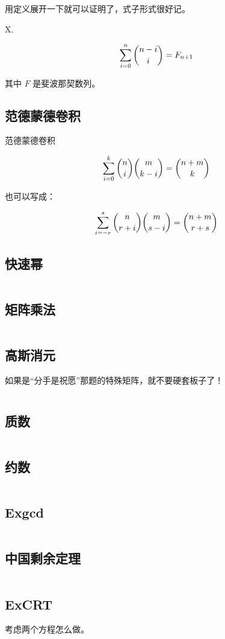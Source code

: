 \documentclass[titlepage, a4paper]{article}
\begin{document}
\begin{multicols}{2}
\begin{spacing}{0.6}
				 	用定义展开一下就可以证明了，式子形式很好记。
				 	
				 	X.
				 	
				 	$$
				 	\sum_{i=0}^n\dbinom{n-i}{i}=F_{n+1}
				 	$$
				 	
				 	其中 $F$ 是斐波那契数列。
			 	\subsection{范德蒙德卷积}
				 	范德蒙德卷积
				 	
				 	$$
				 	\sum\limits_{i = 0}^k \dbinom{n}{i}\dbinom{m}{k - i} = \dbinom{n + m}{k}
				 	$$
				 	
				 	也可以写成：
				 	
				 	$$
				 	\sum\limits_{i = -r}^s \dbinom{n}{r + i} \dbinom{m}{s - i} = \dbinom{n + m}{r + s}
				 	$$
			 	\subsection{快速幂}
			 		\inputminted{cpp}{src/Math/Qpow.cpp}
			 	\subsection{矩阵乘法}
			 		\inputminted{cpp}{src/Math/Matrix_mul.cpp}
			 	\subsection{高斯消元}
			 		如果是“分手是祝愿”那题的特殊矩阵，就不要硬套板子了！
			 		\inputminted{cpp}{src/Math/Gauss_cut.cpp}
			 	\subsection{质数}
			 		\inputminted{cpp}{src/Math/Primes.cpp}
			 	\subsection{约数}
			 		\inputminted{cpp}{src/Math/Factors.cpp}
			 	\subsection{Exgcd}
			 		\inputminted{cpp}{src/Math/Ex_gcd.cpp}
			 	\subsection{中国剩余定理}
			 		\inputminted{cpp}{src/Math/Crt.cpp}
			 		
			 	\subsection{ExCRT}
			 		考虑两个方程怎么做。
			 		

\end{spacing}
\end{multicols}
\end{document}
